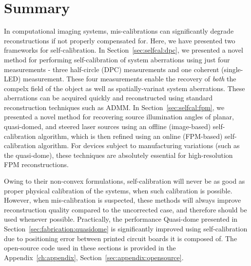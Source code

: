 \section{Summary}

In computational imaging systems, mis-calibrations can significantly degrade reconstructions if not properly compensated for. Here, we have presented two frameworks for self-calibration. In Section~\ref{sec:selfcal:dpc}, we presented a novel method for performing self-calibration of system aberrations using just four measurements - three half-circle (DPC) measurements and one coherent (single-LED) measurement. These four measurements enable the recovery of \textit{both} the compelx field of the object as well as spatially-varinat system aberrations. These aberrations can be acquired quickly and reconstructed using standard reconstruction techniques such as ADMM. In Section~\ref{sec:selfcal:fpm}, we presented a novel method for recovering source illumination angles of planar, quasi-domed, and steered laser sources using an offline (image-based) self-calibration algorithm, which is then refined using an online (FPM-based) self-calibration algorithm. For devices subject to manufacturing variations (such as the quasi-dome), these techniques are absolutely essential for high-resolution FPM reconstructions.

Owing to their non-convex formulations, self-calibration will never be as good as proper physical calibration of the systems, when such calibration is possible. However, when mis-calibration is suspected, these methods will always improve reconstruction quality compared to the uncorrected case, and therefore should be used whenever possible. Practically, the performance Quasi-dome presented in Section~\ref{sec:fabrication:quasidome} is significantly improved using self-calibration due to positioning error between printed circuit boards it is composed of. The open-source code used in these sections is provided in the Appendix~\ref{ch:appendix}, Section~\ref{sec:appendix:opensource}.
